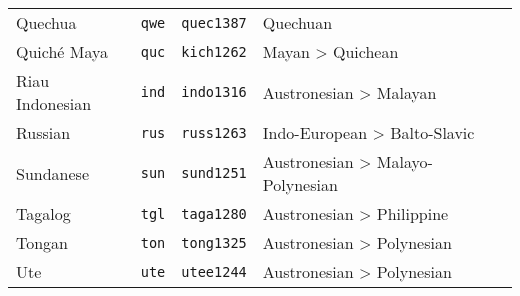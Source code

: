 \begin{table}[h]
\begin{tabularx}{\linewidth}{ l l l l l }
    Quechua                          & \texttt{qwe}       & \texttt{quec1387}   & Quechuan\\
    Quiché Maya                      & \texttt{quc}       & \texttt{kich1262}   & Mayan > Quichean\\
    Riau Indonesian                  & \texttt{ind}       & \texttt{indo1316}   & Austronesian > Malayan\\
    Russian                          & \texttt{rus}       & \texttt{russ1263}   & Indo-European > Balto-Slavic\\
    Sundanese                        & \texttt{sun}       & \texttt{sund1251}   & Austronesian > Malayo-Polynesian\\
    Tagalog                          & \texttt{tgl}       & \texttt{taga1280}   & Austronesian > Philippine\\
    Tongan                           & \texttt{ton}       & \texttt{tong1325}   & Austronesian > Polynesian\\
    Ute                              & \texttt{ute}       & \texttt{utee1244}   & Austronesian > Polynesian\\
  \end{tabularx}
\end{table}
